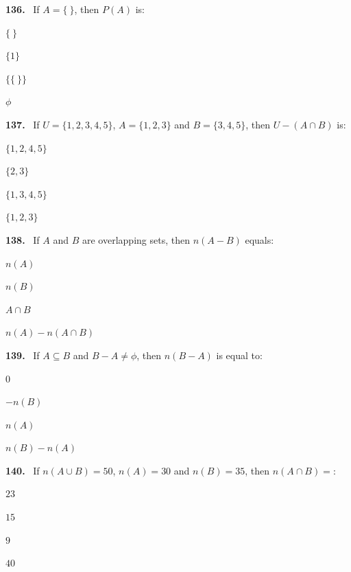\documentclass[11pt]{article}
\newenvironment{qenv}[1]{%
  \par\medskip\noindent\textbf{#1.}\ \ignorespaces
}{\par}
\begin{document}
\begin{qenv}{136} If $A=\{\ \}$, then $P(A)$ is:
\begin{options} \item $\{\ \}$ \item $\{1\}$ \item $\{\{\ \}\}$ \item $\phi$ \end{options} \end{qenv}

\begin{qenv}{137} If $U=\{1,2,3,4,5\}$, $A=\{1,2,3\}$ and $B=\{3,4,5\}$, then $U-(A\cap B)$ is:
\begin{options} \item $\{1,2,4,5\}$ \item $\{2,3\}$ \item $\{1,3,4,5\}$ \item $\{1,2,3\}$ \end{options} \end{qenv}

\begin{qenv}{138} If $A$ and $B$ are overlapping sets, then $n(A-B)$ equals:
\begin{options} \item $n(A)$ \item $n(B)$ \item $A\cap B$ \item $n(A)-n(A\cap B)$ \end{options} \end{qenv}

\begin{qenv}{139} If $A\subseteq B$ and $B-A \neq \phi$, then $n(B-A)$ is equal to:
\begin{options} \item $0$ \item $-n(B)$ \item $n(A)$ \item $n(B)-n(A)$ \end{options} \end{qenv}

\begin{qenv}{140} If $n(A\cup B)=50$, $n(A)=30$ and $n(B)=35$, then $n(A\cap B)=$:
\begin{options} \item $23$ \item $15$ \item $9$ \item $40$ \end{options} \end{qenv}
\end{document}
